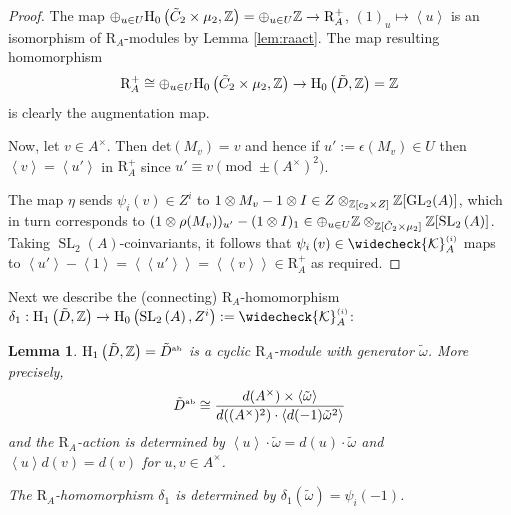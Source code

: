 \documentclass[12pt]{amsart}
\newtheorem{lem}{Lemma}[section]
\theoremstyle{definition}
\newcommand{\Z}{\Bbb{Z}}
\newcommand{\K}{\mathcal{K}}
\newcommand{\spl}[2]{\operatorname{SL}_{#1}\left(#2\right)}
\newcommand{\gl}[2]{\mathrm{GL}_{#1}(#2)}
\newcommand{\suss}[2]{\psi_{#1}\left( #2\right)}
\newcommand{\cks}[2]{\widecheck{{\K}}^{\mbox{\tiny $(#1)$}}_{#2}}
\newcommand{\<}{\langle}
\renewcommand{\>}{\rangle}
\newcommand{\sgr}[1]{\mathrm{R}_{#1}}%
\newcommand{\rsgr}[1]{\widecheck{\mathrm{R}}_{#1}}%
\newcommand{\qsgr}[1]{\mathrm{R}^{+}_{#1}} %
\newcommand{\an}[1]{\left\langle{#1}\right\rangle}
\newcommand{\pf}[1]{\left\langle\!\left\langle{#1}\right\rangle\!\right\rangle}
\newcommand{\gab}[1]{{#1}^{\mbox{\tiny{ab}}}}%
\newcommand{\ho}[3]{\mathrm{H}_{#1}\left( #2,#3 \right)}
\begin{document}
\begin{proof} The map $\oplus_{u\in U}\ho{0}{\tilde{C}_2\times\mu_2}{\Z}=\oplus_{u\in U}\Z\to \qsgr{A}$, $(1)_u\mapsto \an{u}$ is an isomorphism of $\sgr{A}$-modules by 
Lemma \ref{lem:raact}. The map resulting homomorphism
 \[
\qsgr{A}\cong \oplus_{u\in U}\ho{0}{\tilde{C}_2\times\mu_2}{\Z}\to\ho{0}{\tilde{D}}{\Z}=\Z
\]
 is clearly 
the augmentation map. 

Now, let $v\in A^\times$. Then $\mathrm{det}(M_v)=v$ and hence if $u':=\epsilon(M_v)\in U$ then $\an{v}=\an{u'}$ in $\qsgr{A}$ since $u'\equiv v \pmod{\pm (A^\times)^2}$.

The map $\eta$ sends $\suss{i}{v}\in Z^i$ to
 $1\otimes M_v-1\otimes I\in Z\otimes_{\Z[c_2\times Z]}\Z[\gl{2}{A}]$, which in turn corresponds to
 $(1\otimes \rho(M_v))_{u'}-(1\otimes I)_1\in \oplus_{u\in U}\Z\otimes_{\Z[\tilde{C}_2\times\mu_2]}\Z[\spl{2}{A}]$. Taking $\spl{2}{A}$-coinvariants, it follows that $\suss{i}{v}\in\cks{i}{A}$ maps to 
$\an{u'}-\an{1}=\pf{u'}=\pf{v}\in \qsgr{A}$ as required.
\end{proof}




Next we describe the (connecting) $\sgr{A}$-homomorphism $\delta_1:\ho{1}{\tilde{D}}{\Z}\to\ho{0}{\spl{2}{A}}{Z^i}:=\cks{i}{A}$:



\begin{lem}\label{lem:delta1} $\ho{1}{\tilde{D}}{\Z}=\gab{\tilde{D}}$ is a cyclic $\sgr{A}$-module with generator $\tilde{\omega}$. More precisely,
\[
\gab{\tilde{D}}\cong \frac{d(A^\times)\times \an{\tilde{\omega}}}{d((A^\times)^2)\cdot\an{d(-1)\tilde{\omega}^2}}
\]
and the $\sgr{A}$-action is determined by $\an{u}\cdot\tilde{\omega}=d(u)\cdot\tilde{\omega}$ and $\an{u}d(v)=d(v)$ for $u,v\in A^\times$.

The $\sgr{A}$-homomorphism $\delta_1$ is determined by $\delta_1(\tilde{\omega})=\suss{i}{-1}$. 
\end{lem}
\end{document}
